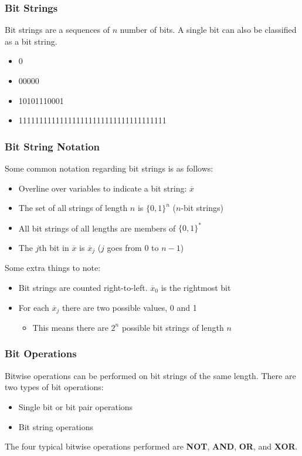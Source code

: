 \documentclass{article}
\begin{document}
\subsubsection{Bit Strings}
Bit strings are a sequences of \(n\) number of bits.
A single bit can also be classified as a bit string.
\begin{itemize}
    \item 0
    \item 00000
    \item 10101110001
    \item 111111111111111111111111111111111111
\end{itemize}
%
\subsubsection{Bit String Notation}
Some common notation regarding bit strings is as follows:
\begin{itemize}
    \item Overline over variables to indicate a bit string: \(\overline{x}\)
    \item The set of all strings of length \(n\) is \(\lbrace 0,1 \rbrace ^n\) (\(n\)-bit strings)
    \item All bit strings of all lengths are members of \(\lbrace 0,1 \rbrace ^*\)
    \item The \(j\)th bit in \(\overline{x}\) is \(\overline{x}_j\) (\(j\) goes from 0 to \(n - 1\))
\end{itemize}
Some extra things to note:
\begin{itemize}
    \item Bit strings are counted right-to-left. \(\overline{x}_0\) is the rightmost bit
    \item For each \(\overline{x}_j\) there are two possible values, 0 and 1
        \begin{itemize}
            \item This means there are \(2^n\) possible bit strings of length \(n\)
        \end{itemize}
\end{itemize}
%
\subsubsection{Bit Operations}
Bitwise operations can be performed on bit strings of the same length.
There are two types of bit operations:
\begin{itemize}
    \item Single bit or bit pair operations
    \item Bit string operations
\end{itemize}
The four typical bitwise operations performed are
\textbf{NOT}, \textbf{AND}, \textbf{OR}, and \textbf{XOR}.
%
\newpage
\end{document}

